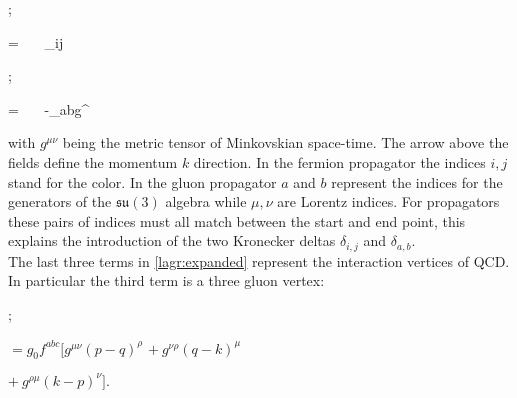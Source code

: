 \begin{minipage}{0.4\textwidth}
\begin{center}
    ;     
\end{center}
\end{minipage}
\begin{minipage}{0.58\textwidth}
        \beq \nonumber = ~~~\delta_{ij} ~~~~~~~~~~~~~~~~~~~~~~~~~~~~~\eeq
\end{minipage} 

\begin{minipage}{0.4\textwidth}
\begin{center}
    ; 
\end{center}
\end{minipage}
\begin{minipage}{0.58\textwidth}
        \beq \nonumber = ~~~-\delta_{ab}g^{\mu\nu} ~~~~~~~~~~~~~~~~~~~~~~~~~~~~\eeq
\end{minipage}

with $g^{\mu\nu}$ being the metric tensor of Minkovskian space-time. The arrow above the fields define the momentum $k$ direction. In the fermion propagator the indices $i,j$ stand for the color. In the gluon propagator $a$ and $b$ represent the indices for the generators of the $\mathfrak{su}(3)$ algebra while $\mu,\nu$ are Lorentz indices. For propagators these pairs of indices must all match between the start and end point, this explains the introduction of the two Kronecker deltas $\delta_{i,j}$ and $\delta_{a,b}$.\\
The last three terms in \cref{lagr:expanded} represent the interaction vertices of QCD. In particular the third term is a three gluon vertex:
\begin{center}
\begin{minipage}{0.4\textwidth}
    \hspace{2cm};
\end{minipage}
\begin{minipage}{0.58\textwidth}
    \hspace{1cm} $ = g_0 f^{abc}[g^{\mu\nu}(p-q)^\rho $ \newline
    \vspace{-0.15cm}
    \hspace{2.0cm} $+~g^{\nu\rho}(q-k)^\mu $ \newline
    
    \vspace{-0.2cm}
    \hspace{2.1cm} $+~g^{\rho\mu}(k-p)^\nu ] .$
\end{minipage}
\end{center}

